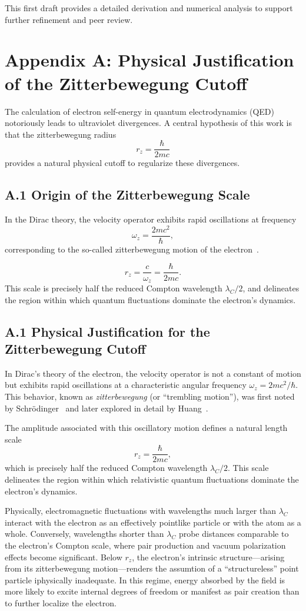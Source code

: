 \documentclass[12pt]{article}
\begin{document}
This first draft provides a detailed derivation and numerical analysis to support further refinement and peer review.

\appendix
\appendix
\section*{Appendix A: Physical Justification of the Zitterbewegung Cutoff}

The calculation of electron self-energy in quantum electrodynamics (QED) notoriously leads to ultraviolet divergences. A central hypothesis of this work is that the zitterbewegung radius
\[
r_z = \frac{\hbar}{2mc}
\]
provides a natural physical cutoff to regularize these divergences.

\subsection*{A.1 Origin of the Zitterbewegung Scale}

In the Dirac theory, the velocity operator exhibits rapid oscillations at frequency
\[
\omega_z = \frac{2mc^2}{\hbar},
\]
corresponding to the so-called zitterbewegung motion of the electron~\cite{Schrodinger1930,Hestenes1990}.

\[
r_z = \frac{c}{\omega_z} = \frac{\hbar}{2mc}.
\]
This scale is precisely half the reduced Compton wavelength \(\lambda_C/2\), and delineates the region within which quantum fluctuations dominate the electron’s dynamics.

\subsection*{A.1 Physical Justification for the Zitterbewegung Cutoff}

In Dirac’s theory of the electron, the velocity operator is not a constant of motion but exhibits rapid oscillations at a characteristic angular frequency \(\omega_z = 2 m c^2 / \hbar\). This behavior, known as \emph{zitterbewegung} (or “trembling motion”), was first noted by Schrödinger~\cite{Schrodinger1930} and later explored in detail by Huang~\cite{Huang1952}. 

The amplitude associated with this oscillatory motion defines a natural length scale
\[
r_z = \frac{\hbar}{2 m c},
\]
which is precisely half the reduced Compton wavelength \(\lambda_C / 2\). This scale delineates the region within which relativistic quantum fluctuations dominate the electron’s dynamics.

Physically, electromagnetic fluctuations with wavelengths much larger than \(\lambda_C\) interact with the electron as an effectively pointlike particle or with the atom as a whole. Conversely, wavelengths shorter than \(\lambda_C\) probe distances comparable to the electron’s Compton scale, where pair production and vacuum polarization effects become significant. Below \(r_z\), the electron’s intrinsic structure—arising from its zitterbewegung motion—renders the assumtion of a “structureless” point particle iphysically inadequate. In this regime, energy absorbed by the field is more likely to excite internal degrees of freedom or manifest as pair creation than to further localize the electron.
\end{document}
